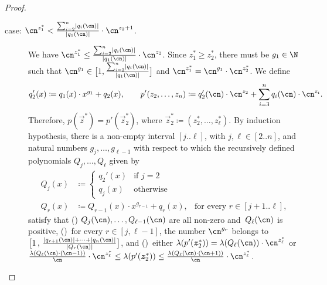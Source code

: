 \begin{proof}
\begin{claimproof}
\begin{description}
\begin{description}
            \item[case: $\cn^{z_1^*} < \frac{\sum_{i=2}^n
            \abs{q_i(\cn)}}{\abs{q_1(\cn)}} \cdot \cn^{z_2+1}$.] We have
              $\cn^{z_1^*} \leq
                \frac{\sum_{i=2}^n \abs{q_i(\cn)}}{\abs{q_1(\cn)}} \cdot
                \cn^{z_2}$.
              Since $z_1^* \geq z_2^*$,
              there must be $g_1 \in \N$ such that $\cn^{g_1} \in
                \big[1,\frac{\sum_{i=2}^n \abs{q_i(\cn)}}{\abs{q_1(\cn)}}\big]$
              and $\cn^{z_1^*} = \cn^{g_1} \cdot \cn^{z_2^*}$.
              We define
              \[
                q_2'(x) \coloneqq q_1(x) \cdot x^{g_1} + q_2(x),
                \qquad
                p'(z_2,\dots,z_n) \coloneqq q_2'(\cn) \cdot \cn^{z_2} +
                \sum_{i=3}^n
                q_i(\cn) \cdot \cn^{z_i}.
              \]
              Therefore, $p(\vec z^*) = p'(\vec z_2^*)$,
              where $\vec z_2^* \coloneqq (z_2^*,\dots,z_\ell^*)$.
              By induction hypothesis,
              there is a non-empty interval $[j..\ell]$, with $j,\ell \in
                [2..n]$,
              and natural numbers ${g_j},\dots,{g_{\ell-1}}$
              with respect to which the recursively defined polynomials
              $Q_j,\dots,Q_{\ell}$ given by
              \begin{align*}
                Q_j(x) & \coloneqq
                \begin{cases}
                  q_2'(x) & \text{if $j = 2$} \\
                  q_j(x)   & \text{otherwise}
                \end{cases}                                \\
                Q_r(x) & \coloneqq Q_{r-1}(x) \cdot x^{g_{r-1}} + q_{r}(x),
                       & \text{for every } r \in [j+1..\ell],
              \end{align*}
              satisfy that
              ()
              $Q_j(\cn),\dots,Q_{\ell-1}(\cn)$ are all non-zero
              and~$Q_\ell(\cn)$ is positive,
              ()~for every $r
                \in
                [j,\ell-1]$, the number
              $\cn^{g_r}$ belongs to
              $\big[1\,,\,\frac{\abs{q_{r+1}(\cn)}+\cdots+\abs{q_n(\cn)}}{\abs{Q_r(\cn)}}\big]$,
              and
              ()~either
              $\lambda(p'(\vec z_2^*)) = \lambda(Q_\ell(\cn)) \cdot
                \cn^{z_\ell^*}$ or
              $\frac{\lambda(Q_\ell(\cn) \cdot (\cn-1))}{\cn} \cdot \cn^{z_\ell^*} \leq
                \lambda(p'(\vec z_2^*)) \leq
                \frac{\lambda(Q_\ell(\cn) \cdot (\cn+1))}{\cn} \cdot
                \cn^{z_\ell^*}$.
  

\end{description}
\end{description}
\end{claimproof}
\end{proof}
